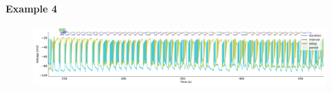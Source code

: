 \paragraph{\large{Example 4}}

\begin{figure}[htbp]
	\centering
	\begin{minipage}[b]{\textwidth}
		\centering
		\includegraphics[width=\textwidth]{./invariants/data/SUSSEX/CV1a_driven4/images/stim_cv1a4_3phases_signal_intervals_zoom.pdf}
	\end{minipage}
	\centering
	\begin{minipage}[b]{0.45\textwidth}
		\centering

\end{minipage}
\end{figure}
